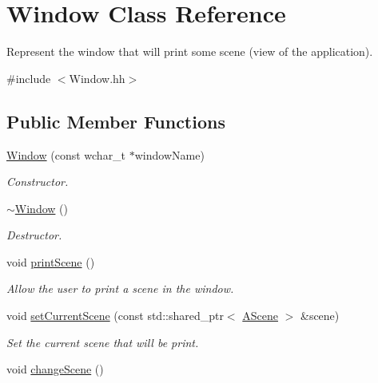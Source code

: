 \hypertarget{classWindow}{}\section{Window Class Reference}
\label{classWindow}


Represent the window that will print some scene (view of the application).  




{\ttfamily \#include $<$Window.\+hh$>$}

\subsection*{Public Member Functions}
\begin{DoxyCompactItemize}
\item 
\hyperlink{classWindow_a25fd6af55e81b781b132166f77daf77e}{Window} (const wchar\+\_\+t $\ast$window\+Name)
\begin{DoxyCompactList}\small\item\em Constructor. \end{DoxyCompactList}\item 
\hyperlink{classWindow_a245d821e6016fa1f6970ccbbedd635f6}{$\sim$\+Window} ()
\begin{DoxyCompactList}\small\item\em Destructor. \end{DoxyCompactList}\item 
\mbox{\label{classWindow_a859f97c29b98a58809d485f0cf5d36d7}} 
void \hyperlink{classWindow_a859f97c29b98a58809d485f0cf5d36d7}{print\+Scene} ()
\begin{DoxyCompactList}\small\item\em Allow the user to print a scene in the window. \end{DoxyCompactList}\item 
void \hyperlink{classWindow_ac2515da6ca76f5f4466c7421e95cddfe}{set\+Current\+Scene} (const std\+::shared\+\_\+ptr$<$ \hyperlink{classAScene}{A\+Scene} $>$ \&scene)
\begin{DoxyCompactList}\small\item\em Set the current scene that will be print. \end{DoxyCompactList}\item 
\mbox{\label{classWindow_af1b2a635ce47d9e841445b8b866a3b28}} 
void \hyperlink{classWindow_af1b2a635ce47d9e841445b8b866a3b28}{change\+Scene} ()

\end{DoxyCompactItemize}
